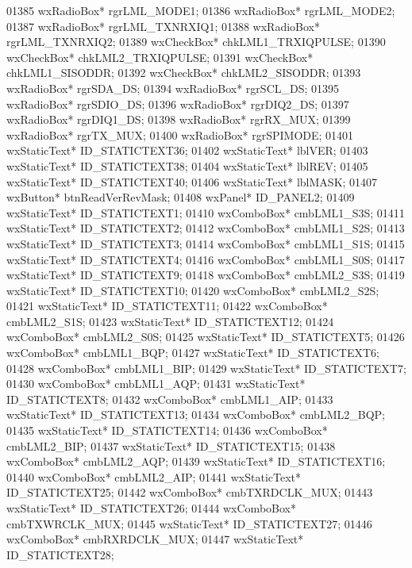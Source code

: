 \begin{DoxyCode}
01385         wxRadioBox* rgrLML_MODE1;
01386         wxRadioBox* rgrLML_MODE2;
01387         wxRadioBox* rgrLML_TXNRXIQ1;
01388         wxRadioBox* rgrLML_TXNRXIQ2;
01389         wxCheckBox* chkLML1_TRXIQPULSE;
01390         wxCheckBox* chkLML2_TRXIQPULSE;
01391         wxCheckBox* chkLML1_SISODDR;
01392         wxCheckBox* chkLML2_SISODDR;
01393         wxRadioBox* rgrSDA_DS;
01394         wxRadioBox* rgrSCL_DS;
01395         wxRadioBox* rgrSDIO_DS;
01396         wxRadioBox* rgrDIQ2_DS;
01397         wxRadioBox* rgrDIQ1_DS;
01398         wxRadioBox* rgrRX_MUX;
01399         wxRadioBox* rgrTX_MUX;
01400         wxRadioBox* rgrSPIMODE;
01401         wxStaticText* ID_STATICTEXT36;
01402         wxStaticText* lblVER;
01403         wxStaticText* ID_STATICTEXT38;
01404         wxStaticText* lblREV;
01405         wxStaticText* ID_STATICTEXT40;
01406         wxStaticText* lblMASK;
01407         wxButton* btnReadVerRevMask;
01408         wxPanel* ID_PANEL2;
01409         wxStaticText* ID_STATICTEXT1;
01410         wxComboBox* cmbLML1_S3S;
01411         wxStaticText* ID_STATICTEXT2;
01412         wxComboBox* cmbLML1_S2S;
01413         wxStaticText* ID_STATICTEXT3;
01414         wxComboBox* cmbLML1_S1S;
01415         wxStaticText* ID_STATICTEXT4;
01416         wxComboBox* cmbLML1_S0S;
01417         wxStaticText* ID_STATICTEXT9;
01418         wxComboBox* cmbLML2_S3S;
01419         wxStaticText* ID_STATICTEXT10;
01420         wxComboBox* cmbLML2_S2S;
01421         wxStaticText* ID_STATICTEXT11;
01422         wxComboBox* cmbLML2_S1S;
01423         wxStaticText* ID_STATICTEXT12;
01424         wxComboBox* cmbLML2_S0S;
01425         wxStaticText* ID_STATICTEXT5;
01426         wxComboBox* cmbLML1_BQP;
01427         wxStaticText* ID_STATICTEXT6;
01428         wxComboBox* cmbLML1_BIP;
01429         wxStaticText* ID_STATICTEXT7;
01430         wxComboBox* cmbLML1_AQP;
01431         wxStaticText* ID_STATICTEXT8;
01432         wxComboBox* cmbLML1_AIP;
01433         wxStaticText* ID_STATICTEXT13;
01434         wxComboBox* cmbLML2_BQP;
01435         wxStaticText* ID_STATICTEXT14;
01436         wxComboBox* cmbLML2_BIP;
01437         wxStaticText* ID_STATICTEXT15;
01438         wxComboBox* cmbLML2_AQP;
01439         wxStaticText* ID_STATICTEXT16;
01440         wxComboBox* cmbLML2_AIP;
01441         wxStaticText* ID_STATICTEXT25;
01442         wxComboBox* cmbTXRDCLK_MUX;
01443         wxStaticText* ID_STATICTEXT26;
01444         wxComboBox* cmbTXWRCLK_MUX;
01445         wxStaticText* ID_STATICTEXT27;
01446         wxComboBox* cmbRXRDCLK_MUX;
01447         wxStaticText* ID_STATICTEXT28;

\end{DoxyCode}
